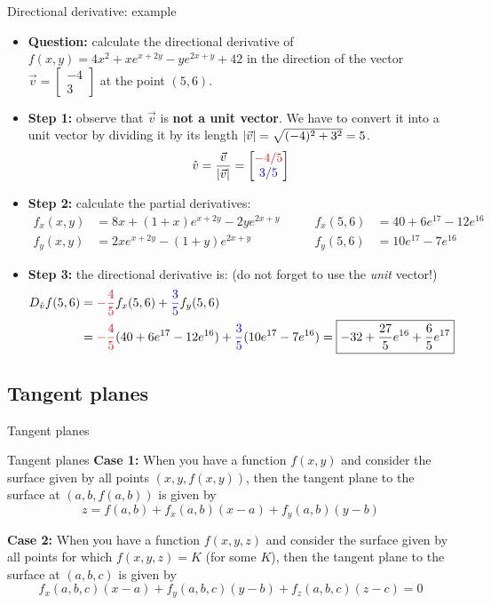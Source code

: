 \begin{frame}{Directional derivative: example}
\footnotesize
    \begin{itemize}
        \item \textbf{Question:} calculate the directional derivative of $f(x,y)=4x^2+xe^{x+2y}-ye^{2x+y}+42$ in the direction of the vector $\vec{v}=\begin{bmatrix}-4\\3\end{bmatrix}$ at the point $(5,6)$.
        \item \textbf{Step 1:} observe that $\vec{v}$ is \textbf{not a unit vector}. We have to convert it into a unit vector by dividing it by its length $|\vec{v}|=\sqrt{(-4)^2+3^2}=5$.
        \[\hat{v}=\frac{\vec{v}}{|\vec{v}|}=\begin{bmatrix}\textcolor{red}{-4/5}\\\textcolor{blue}{3/5}\end{bmatrix}\]
        \item \textbf{Step 2:} calculate the partial derivatives:
        \begin{align*}
            f_x(x,y)&=8x+(1+x)e^{x+2y}-2ye^{2x+y}\qquad&f_x(5,6)&=40+6e^{17}-12e^{16}\\
            f_y(x,y)&=2xe^{x+2y}-(1+y)e^{2x+y} &f_y(5,6)&=10e^{17}-7e^{16}
        \end{align*}
        \item \textbf{Step 3:} the directional derivative is: (do not forget to use the \textit{unit} vector!)
        \begin{align*}D_{\hat{v}}f(5,6)&=\textcolor{red}{-\frac{4}{5}}f_x(5,6)+\textcolor{blue}{\frac{3}{5}}f_y(5,6)\\
        &=\textcolor{red}{-\frac{4}{5}}(40+6e^{17}-12e^{16})+\textcolor{blue}{\frac{3}{5}}(10e^{17}-7e^{16})=\boxed{-32+\frac{27}{5}e^{16}+\frac{6}{5}e^{17}}
        \end{align*}
    \end{itemize}
\end{frame}


\subsection{Tangent planes}

\begin{frame}{Tangent planes}
    \begin{theorybox}{Tangent planes}
        \textbf{Case 1:} When you have a function $f(x,y)$ and consider the surface given by all points $(x,y,f(x,y))$, then the tangent plane to the surface at $(a,b,f(a,b))$ is given by \[\boxed{z=f(a,b)+f_x(a,b)(x-a)+f_y(a,b)(y-b)}\]

        \textbf{Case 2:} When you have a function $f(x,y,z)$ and consider the surface given by all points for which $f(x,y,z)=K$ (for some $K$), then the tangent plane to the surface at $(a,b,c)$ is given by
        \[\boxed{f_x(a,b,c)(x-a)+f_y(a,b,c)(y-b)+f_z(a,b,c)(z-c)=0}\]
    \end{theorybox}
\end{frame}

